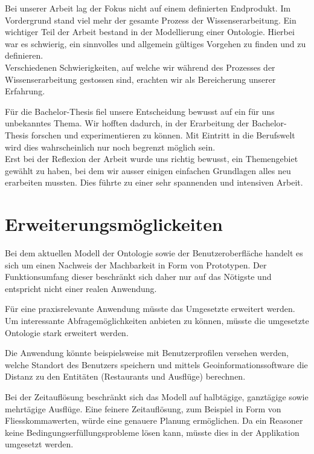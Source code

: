 Bei unserer Arbeit lag der Fokus nicht auf einem definierten Endprodukt. Im Vordergrund stand viel mehr der gesamte Prozess der Wissenserarbeitung. Ein wichtiger Teil der Arbeit bestand in der Modellierung einer Ontologie. Hierbei war es schwierig, ein sinnvolles und allgemein gültiges Vorgehen zu finden und zu definieren.\\
Verschiedenen Schwierigkeiten, auf welche wir während des Prozesses der Wissenserarbeitung gestossen sind, erachten wir als Bereicherung unserer Erfahrung.

Für die Bachelor-Thesis fiel unsere Entscheidung bewusst auf ein für uns unbekanntes Thema. Wir hofften dadurch, in der Erarbeitung der Bachelor-Thesis forschen und experimentieren zu können. Mit Eintritt in die Berufswelt wird dies wahrscheinlich nur noch begrenzt möglich sein.\\
Erst bei der Reflexion der Arbeit wurde uns richtig bewusst, ein Themengebiet gewählt zu haben, bei dem wir ausser einigen einfachen Grundlagen alles neu erarbeiten mussten. Dies führte zu einer sehr spannenden und intensiven Arbeit.


\section{Erweiterungsmöglickeiten}
\label{sec:fazit_subchap}
Bei dem aktuellen Modell der Ontologie sowie der Benutzeroberfläche handelt es sich um einen Nachweis der Machbarkeit in Form von Prototypen. Der Funktionsumfang dieser beschränkt sich daher nur auf das Nötigste und entspricht nicht einer realen Anwendung.

Für eine praxisrelevante Anwendung müsste das Umgesetzte erweitert werden. Um interessante Abfragemöglichkeiten anbieten zu können, müsste die umgesetzte Ontologie stark erweitert werden.

Die Anwendung könnte beispielsweise mit Benutzerprofilen versehen werden, welche Standort des Benutzers speichern und mittels Geoinformationssoftware die Distanz zu den Entitäten (Restaurants und Ausflüge) berechnen.

Bei der Zeitauflösung beschränkt sich das Modell auf halbtägige, ganztägige sowie mehrtägige Ausflüge. Eine feinere Zeitauflösung, zum Beispiel in Form von Fliesskommawerten, würde eine genauere Planung ermöglichen. Da ein Reasoner keine Bedingungserfüllungsprobleme lösen kann, müsste dies in der Applikation umgesetzt werden.
